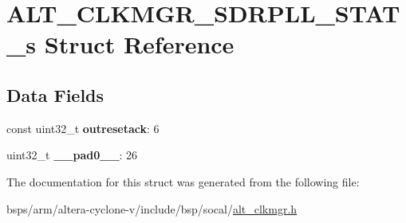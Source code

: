 \hypertarget{structALT__CLKMGR__SDRPLL__STAT__s}{}\section{A\+L\+T\+\_\+\+C\+L\+K\+M\+G\+R\+\_\+\+S\+D\+R\+P\+L\+L\+\_\+\+S\+T\+A\+T\+\_\+s Struct Reference}
\label{structALT__CLKMGR__SDRPLL__STAT__s}
\subsection*{Data Fields}
\begin{DoxyCompactItemize}
\item 
\mbox{\label{structALT__CLKMGR__SDRPLL__STAT__s_a6ec93eb5a858ee0f04ebd3e1d656c384}} 
const uint32\+\_\+t {\bfseries outresetack}\+: 6
\item 
\mbox{\label{structALT__CLKMGR__SDRPLL__STAT__s_ac7fdadebb59b07f68e38a2fee0e696c5}} 
uint32\+\_\+t {\bfseries \+\_\+\+\_\+pad0\+\_\+\+\_\+}\+: 26
\end{DoxyCompactItemize}


The documentation for this struct was generated from the following file\+:\begin{DoxyCompactItemize}
\item 
bsps/arm/altera-\/cyclone-\/v/include/bsp/socal/\mbox{\hyperlink{alt__clkmgr_8h}{alt\+\_\+clkmgr.\+h}}\end{DoxyCompactItemize}
